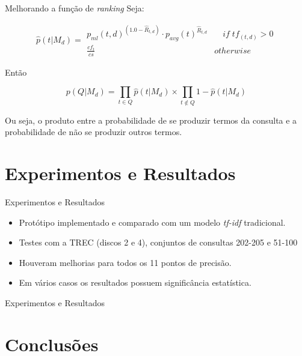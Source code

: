 \documentclass[compress]{beamer}
\begin{document}
    \begin{frame}{Melhorando a função de \emph{ranking}}
            Seja:

            \[
            \hat{p}(t|M_{d})=\begin{array}{cc}
            p_{ml}\left(t,d\right)^{(1.0-\hat{R}_{t,d})}\cdot p_{avg}\left(t\right)^{\hat{R}_{t,d}} & \quad if\; tf_{\left(t,d\right)}>0\\
            \frac{cf_{t}}{cs} & otherwise\end{array}\]


            Então

            \[
            p\left(Q|M_{d}\right)=\prod_{t\in Q}\hat{p}\left(t|M_{d}\right)\times\prod_{t\notin Q}1-\hat{p}\left(t|M_{d}\right)\]


            Ou seja, o produto entre a probabilidade de se produzir termos da
            consulta e a probabilidade de não se produzir outros termos.

    \end{frame}

\section{Experimentos e Resultados}


    \begin{frame}{Experimentos e Resultados}
            \begin{itemize}
            	\item Protótipo implementado e comparado com um modelo
                \emph{tf-idf} tradicional.
                \item Testes com a TREC (discos 2 e 4), conjuntos de
                consultas 202-205 e 51-100
                \item Houveram melhorias para todos os 11 pontos de
                precisão.
                \item Em vários casos os resultados possuem
                significância  estatística.
            \end{itemize}
    \end{frame}


    \begin{frame}{Experimentos e Resultados}
    \end{frame}


\section{Conclusões}
\end{document}
